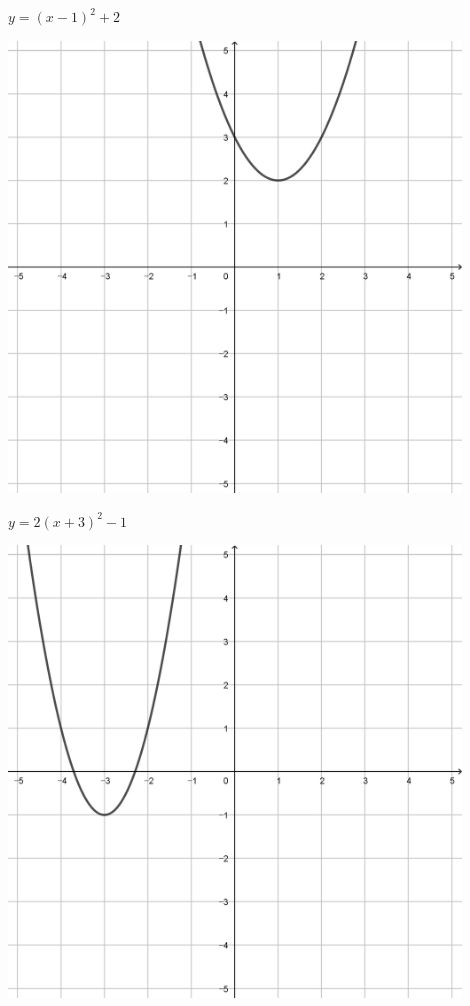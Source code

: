 \documentclass[a4paper]{oblivoir}
\begin{document}
\clearpage
\begin{minipage}{0.45\textwidth}\centering
\(y=(x-1)^2+2\)
\par\bigskip\includegraphics[width=0.9\textwidth]{img/2_quadratic_17}
\end{minipage}
\begin{minipage}{0.45\textwidth}\centering
\(y=2(x+3)^2-1\)
\par\bigskip\includegraphics[width=0.9\textwidth]{img/2_quadratic_18}
\end{minipage}\bigskip\bigskip\par
\end{document}
